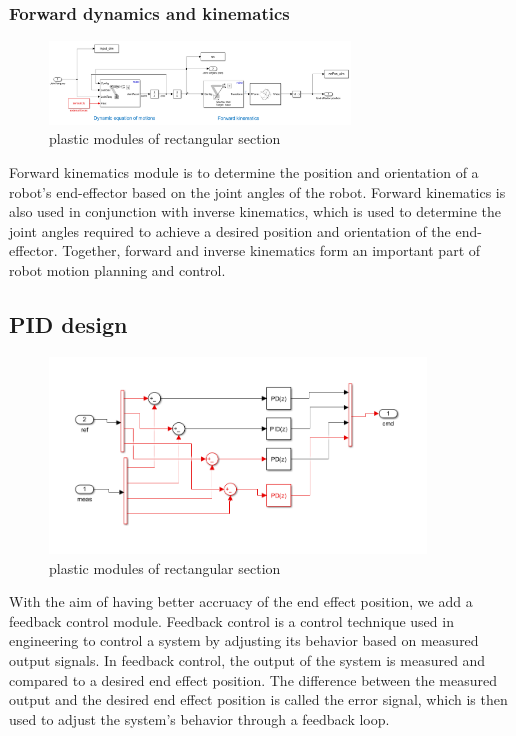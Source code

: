 \subsubsection*{Forward dynamics and kinematics}

\begin{figure}[htbp]
    \centering
    \includegraphics[width=8cm]{./fig/FDK.png}
    \caption{plastic modules of rectangular section  }
    \label{f1}
\end{figure}

Forward kinematics module is to determine the position and orientation of a robot's end-effector based on the joint angles of the robot. 
Forward kinematics is also used in conjunction with inverse kinematics, which is used to determine the joint angles required to achieve a desired position and orientation of the end-effector. Together, forward and inverse kinematics form an important part of robot motion planning and control.



\subsection{PID design}

\begin{figure}[htbp]
    \centering
    \includegraphics[width=10cm]{./fig/PID.png}
    \caption{plastic modules of rectangular section}
    \label{f1}
\end{figure}


With the aim of having better accruacy of the end effect position, we add a feedback control module. Feedback control is a control technique used in engineering to control a system by adjusting its behavior based on measured output signals. In feedback control, the output of the system is measured and compared to a desired end effect position. The difference between the measured output and the desired end effect position is called the error signal, which is then used to adjust the system's behavior through a feedback loop.

